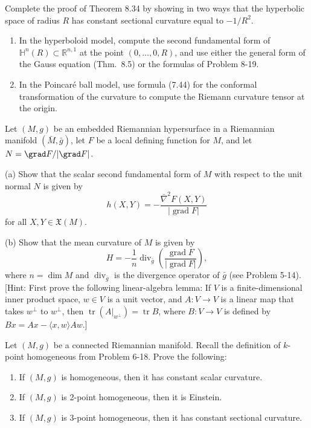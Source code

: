 \begin{exercise}
\label{prob:hyperbolic-constant-curvature}
Complete the proof of Theorem 8.34 by showing in two ways that the hyperbolic space of radius $R$ has constant sectional curvature equal to $-1/R^2$.

\begin{enumerate}
\item[(a)] In the hyperboloid model, compute the second fundamental form of $\mathbb{H}^n(R) \subset \mathbb{R}^{n,1}$ at the point $(0,\ldots,0,R)$, and use either the general form of the Gauss equation (Thm.\ 8.5) or the formulas of Problem 8-19.

\item[(b)] In the Poincar\'e ball model, use formula (7.44) for the conformal transformation of the curvature to compute the Riemann curvature tensor at the origin.
\end{enumerate}
\end{exercise}

\begin{exercise}
\label{prob:hypersurface-defining-function}
Let $(M, g)$ be an embedded Riemannian hypersurface in a Riemannian manifold $(\bar{M}, \bar{g})$, let $F$ be a local defining function for $M$, and let $N = \grad F / |\grad F|$.

(a) Show that the scalar second fundamental form of $M$ with respect to the unit normal $N$ is given by
\[
h(X,Y) = -\frac{\bar{\nabla}^2 F(X,Y)}{|\operatorname{grad} F|}
\]
for all $X,Y \in \mathfrak{X}(M)$.

(b) Show that the mean curvature of $M$ is given by
\[
H = -\frac{1}{n} \operatorname{div}_{\bar{g}} \left( \frac{\operatorname{grad} F}{|\operatorname{grad} F|} \right),
\]
where $n = \dim M$ and $\operatorname{div}_{\bar{g}}$ is the divergence operator of $\bar{g}$ (see Problem 5-14). [Hint: First prove the following linear-algebra lemma: If $V$ is a finite-dimensional inner product space, $w \in V$ is a unit vector, and $A: V \to V$ is a linear map that takes $w^{\perp}$ to $w^{\perp}$, then $\operatorname{tr}(A|_{w^{\perp}}) = \operatorname{tr} B$, where $B: V \to V$ is defined by $Bx = Ax - \langle x, w \rangle Aw$.]
\end{exercise}

\begin{exercise}
\label{prob:k-point-homogeneous-ch8}
Let $(M,g)$ be a connected Riemannian manifold. Recall the definition of $k$-point homogeneous from Problem 6-18. Prove the following:
\begin{enumerate}
\item[(a)] If $(M,g)$ is homogeneous, then it has constant scalar curvature.
\item[(b)] If $(M,g)$ is 2-point homogeneous, then it is Einstein.
\item[(c)] If $(M,g)$ is 3-point homogeneous, then it has constant sectional curvature.
\end{enumerate}
\end{exercise}

